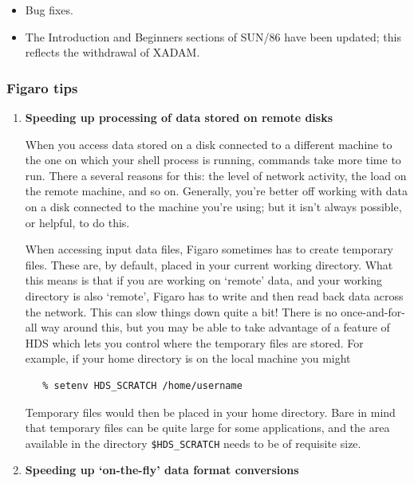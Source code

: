 \begin{itemize}
\item Bug fixes.

\item The Introduction and Beginners sections of SUN/86 have been
      updated; this reflects the withdrawal of XADAM.

\end{itemize}

\subsubsection{\label{news516_figaro_tips}Figaro tips}

\begin{enumerate}

\item {\bf Speeding up processing of data stored on remote disks}

      When you access data stored on a disk connected to a different
      machine to the one on which your shell process is running,
      commands take more time to run.  There a several reasons for this:
      the level of network activity, the load on the remote machine,
      and so on.  Generally, you're better off working with data on a
      disk connected to the machine you're using; but it isn't always
      possible, or helpful, to do this.

      When accessing input data files, Figaro sometimes has to create
      temporary files.  These are, by default, placed in your current
      working directory.  What this means is that if you are working
      on `remote' data, and your working directory is also `remote',
      Figaro has to write and then read back data across the network.
      This can slow things down quite a bit!  There is no
      once-and-for-all way around this, but you may be able to take
      advantage
      of a feature of HDS which lets you control where the temporary
      files are stored.  For example, if your home directory
      is on the local machine you might

\begin{verbatim}
   % setenv HDS_SCRATCH /home/username
\end{verbatim}

      Temporary files would then be placed in your home directory.
      Bare in mind that temporary files can be quite large for some
      applications, and the area available in the directory
      \verb+$HDS_SCRATCH+ needs to be of requisite size.

\item {\bf Speeding up `on-the-fly' data format conversions}


\end{enumerate}
